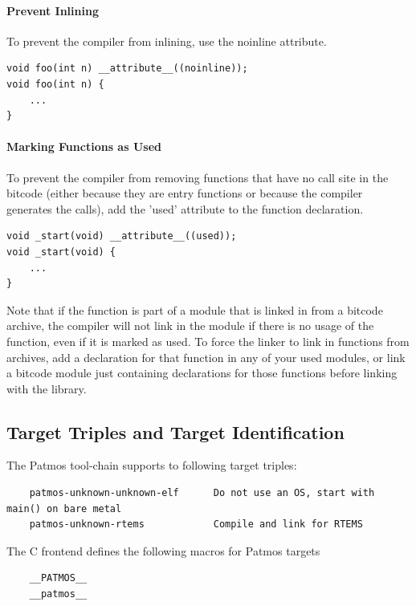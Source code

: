 \paragraph{Prevent Inlining}
To prevent the compiler from inlining, use the noinline attribute.

\begin{verbatim}
void foo(int n) __attribute__((noinline));
void foo(int n) {
    ...
}
\end{verbatim}

\paragraph{Marking Functions as Used}
To prevent the compiler from removing functions that have no call site in the bitcode
(either because they are entry functions or because the compiler generates the calls),
add the 'used' attribute to the function declaration.

\begin{verbatim}
void _start(void) __attribute__((used));
void _start(void) {
    ...
}
\end{verbatim}

Note that if the function is part of a module that is linked in from a bitcode archive,
the compiler will not link in the module if there is no usage of the function, even if it
is marked as used. To force the linker to link in functions from archives, add a declaration
for that function in any of your used modules, or link a bitcode module just containing declarations
for those functions before linking with the library.



\subsection{Target Triples and Target Identification}

The Patmos tool-chain supports to following target triples:

\begin{verbatim}
    patmos-unknown-unknown-elf      Do not use an OS, start with main() on bare metal
    patmos-unknown-rtems            Compile and link for RTEMS
\end{verbatim}

The C frontend defines the following macros for Patmos targets

\begin{verbatim}
    __PATMOS__
    __patmos__
\end{verbatim}

